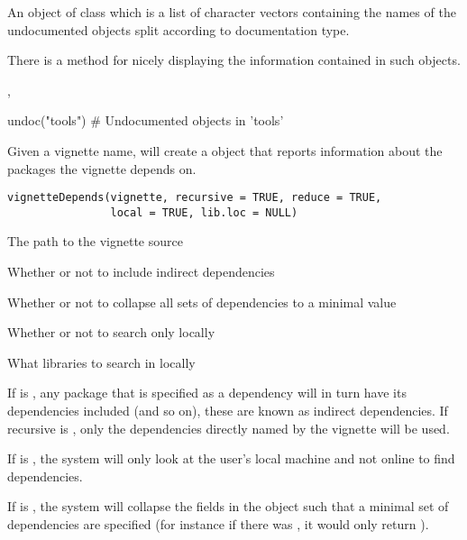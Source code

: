 %
\begin{Value}
An object of class  which is a list of character vectors
containing the names of the undocumented objects split according to
documentation type.

There is a  method for nicely displaying the information
contained in such objects.
\end{Value}
%
\begin{SeeAlso}\relax
{}, 
\end{SeeAlso}
%
\begin{Examples}
\begin{ExampleCode}
undoc("tools")                  # Undocumented objects in 'tools'
\end{ExampleCode}
\end{Examples}
%
\begin{Description}\relax
Given a vignette name, will create a  object that
reports information about the packages the vignette depends on.
\end{Description}
%
\begin{Usage}
\begin{verbatim}
vignetteDepends(vignette, recursive = TRUE, reduce = TRUE,
                local = TRUE, lib.loc = NULL)
\end{verbatim}
\end{Usage}
%
\begin{Arguments}
\begin{ldescription}
\item[\code{vignette}] The path to the vignette source
\item[\code{recursive}] Whether or not to include indirect dependencies
\item[\code{reduce}] Whether or not to collapse all sets of dependencies to a
minimal value
\item[\code{local}] Whether or not to search only locally
\item[\code{lib.loc}] What libraries to search in locally
\end{ldescription}
\end{Arguments}
%
\begin{Details}\relax
If  is , any package that is specified as a
dependency will in turn have its dependencies included (and so on),
these are known as indirect dependencies.  If recursive is
, only the dependencies directly named by the vignette
will be used.

If  is , the system will only look at the
user's local machine and not online to find dependencies.

If  is , the system will collapse the fields in the
 object such that a minimal set of dependencies
are specified (for instance if there was
, it would only return
).
\end{Details}
